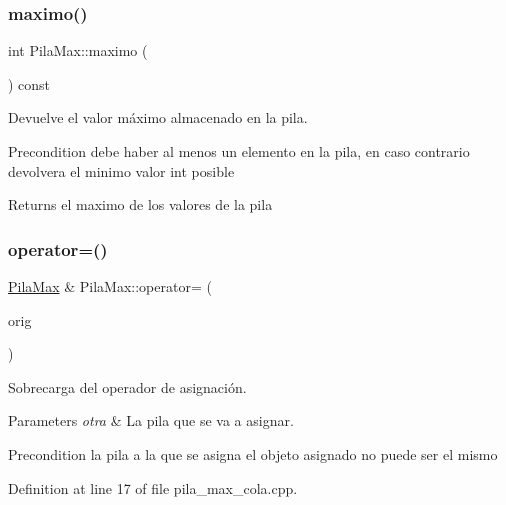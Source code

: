 \subsubsection{\texorpdfstring{maximo()}{maximo()}\hspace{0.1cm}{\footnotesize\ttfamily [2/2]}}
{\footnotesize\ttfamily int Pila\+Max\+::maximo (\begin{DoxyParamCaption}{ }\end{DoxyParamCaption}) const}



Devuelve el valor máximo almacenado en la pila. 

\begin{DoxyPrecond}{Precondition}
debe haber al menos un elemento en la pila, en caso contrario devolvera el minimo valor int posible
\end{DoxyPrecond}
\begin{DoxyReturn}{Returns}
el maximo de los valores de la pila 
\end{DoxyReturn}
\mbox{\label{classPilaMax_a915926c0eff1f0e297895518a05405d7}} 
\subsubsection{\texorpdfstring{operator=()}{operator=()}\hspace{0.1cm}{\footnotesize\ttfamily [1/2]}}
{\footnotesize\ttfamily \hyperlink{classPilaMax}{Pila\+Max} \& Pila\+Max\+::operator= (\begin{DoxyParamCaption}\item[{const \hyperlink{classPilaMax}{Pila\+Max} \&}]{orig }\end{DoxyParamCaption})}



Sobrecarga del operador de asignación. 


\begin{DoxyParams}{Parameters}
{\em otra} & La pila que se va a asignar. \\
\hline
\end{DoxyParams}
\begin{DoxyPrecond}{Precondition}
la pila a la que se asigna el objeto asignado no puede ser el mismo 
\end{DoxyPrecond}


Definition at line 17 of file pila\+\_\+max\+\_\+cola.\+cpp.


